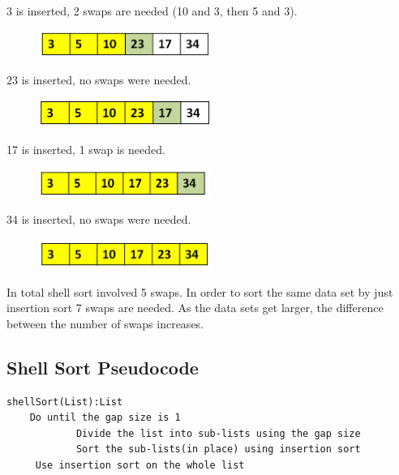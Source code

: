 3 is inserted, 2 swaps are needed (10 and 3, then 5 and 3).

\begin{figure}[H]
\centering
\includegraphics[width=0.5\textwidth]{pictures/shell6.png}
\label{fig:shell6}
\end{figure}

23 is inserted, no swaps were needed.

\begin{figure}[H]
\centering
\includegraphics[width=0.5\textwidth]{pictures/shell7.png}
\label{fig:shell7}
\end{figure}

17 is inserted, 1 swap is needed.

\begin{figure}[H]
\centering
\includegraphics[width=0.5\textwidth]{pictures/shell8.png}
\label{fig:shell8}
\end{figure}

34 is inserted, no swaps were needed.

\begin{figure}[H]
\centering
\includegraphics[width=0.5\textwidth]{pictures/shell9.png}
\label{fig:shell9}
\end{figure}

In total shell sort involved 5 swaps. In order to sort the same data set by just insertion sort 7 swaps are needed. As the data sets get larger, the difference between the number of swaps increases.

\subsection{Shell Sort Pseudocode}

\begin{lstlisting}
shellSort(List):List
	Do until the gap size is 1
            Divide the list into sub-lists using the gap size 
            Sort the sub-lists(in place) using insertion sort
	 Use insertion sort on the whole list

\end{lstlisting}


